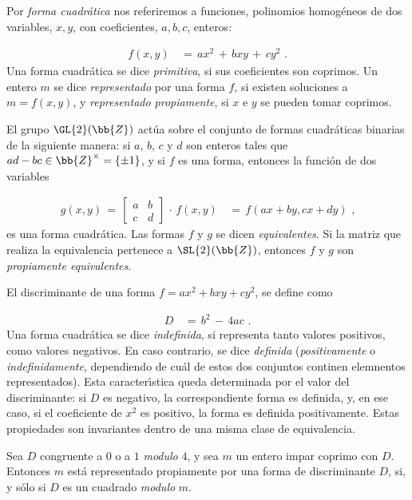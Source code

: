 
Por \emph{forma cuadr\'{a}tica} nos referiremos a funciones, polinomios
homog\'{e}neos de dos variables, $x,y$, con coeficientes, $a,b,c$,
enteros:

\begin{align*}
f(x,y) & \,=\,ax^{2}\,+\,bxy\,+\,cy^{2}\text{ .}
\end{align*}
Una forma cuadr\'{a}tica se dice \emph{primitiva}, si sus coeficientes
son coprimos. Un entero $m$ se dice \emph{representado} por una forma
$f$, si existen soluciones a $m=f(x,y)$, y
\emph{representado propiamente}, si $x$ e $y$ se pueden tomar
coprimos.

El grupo $\GL{2}(\bb{Z})$ act\'{u}a sobre el conjunto de formas
cuadr\'{a}ticas binarias de la siguiente manera: si
$a$, $b$, $c$ y $d$ son enteros tales que
$ad-bc\in\bb{Z}^{\times}=\{\pm 1\}$, y si $f$ es una forma, entonces
la funci\'{o}n de dos variables

\begin{align*}
g(x,y)\,=\,
\begin{bmatrix}a&b\\c&d\end{bmatrix}\,\cdot\,f(x,y) &
\,=\,f(ax+by,cx+dy)\text{ ,}
\end{align*}
es una forma cuadr\'{a}tica. Las formas $f$ y $g$ se dicen
\emph{equivalentes}. Si la matriz que realiza la equivalencia
pertenece a $\SL{2}(\bb{Z})$, entonces $f$ y $g$ son
\emph{propiamente equivalentes}.

El discriminante de una forma $f=ax^{2}+bxy+cy^{2}$, se define como

\begin{align*}
D & \,=\,b^{2}\,-\,4ac\text{ .}
\end{align*}
Una forma cuadr\'{a}tica se dice \emph{indefinida}, si representa
tanto valores positivos, como valores negativos. En caso contrario,
se dice \emph{definida} (\emph{positivamente} o \emph{indefinidamente},
dependiendo de cu\'{a}l de estos dos conjuntos continen elemnentos
representados). Esta caracter\'{\i}stica queda determinada por el
valor del discriminante: si $D$ es negativo, la correspondiente
forma es definida, y, en ese caso, si el coeficiente de $x^{2}$ es
positivo, la forma es definida positivamente. Estas propiedades son
invariantes dentro de una misma clase de equivalencia.

\begin{definicionesLemaRepPorFormasDeDiscriminanteFijo}
Sea $D$ congruente a $0$ o a $1$ \textit{modulo} $4$, y sea $m$ un
entero impar coprimo con $D$. Entonces $m$ est\'{a} representado
propiamente por una forma de discriminante $D$, si, y s\'{o}lo si
$D$ es un cuadrado \textit{modulo} $m$.
\end{definicionesLemaRepPorFormasDeDiscriminanteFijo}

